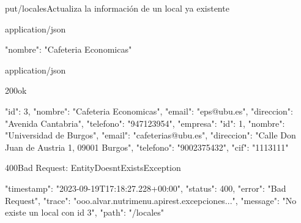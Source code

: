 \begin{apiRoute}{put}{/locales}{Actualiza la información de un local ya existente}
	\begin{routeParameter}
	\end{routeParameter}
	
	\begin{routeRequest}{application/json}
		\begin{routeRequestBody}
{
	"nombre": "Cafeteria Economicas"
}
		\end{routeRequestBody}
	\end{routeRequest}
	\begin{routeResponse}{application/json}
		\begin{routeResponseItem}{200}{ok}
			\begin{routeResponseItemBody}
{
    "id": 3,
    "nombre": "Cafeteria Economicas",
    "email": "eps@ubu.es",
    "direccion": "Avenida Cantabria",
    "telefono": "947123954",
    "empresa": {
        "id": 1,
        "nombre": "Universidad de Burgos",
        "email": "cafeterias@ubu.es",
        "direccion": "Calle Don Juan de Austria 1, 09001 Burgos",
        "telefono": "9002375432",
        "cif": "1113111"
    }
}
			\end{routeResponseItemBody}
		\end{routeResponseItem}
		\begin{routeResponseItem}{400}{Bad Request: EntityDoesntExistsException}
			\begin{routeResponseItemBody}
{
    "timestamp": "2023-09-19T17:18:27.228+00:00",
    "status": 400,
    "error": "Bad Request",
    "trace": "ooo.alvar.nutrimenu.apirest.excepciones...",
    "message": "No existe un local con id 3",
    "path": "/locales"
}
			\end{routeResponseItemBody}
		\end{routeResponseItem}
	\end{routeResponse}
\end{apiRoute}

